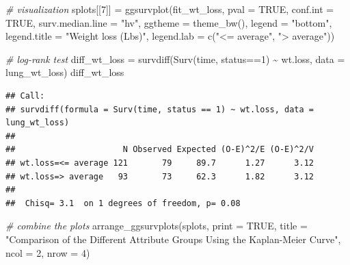 \documentclass[
]{article}
\newenvironment{Shaded}{\begin{snugshade}}{\end{snugshade}}
\newcommand{\AttributeTok}[1]{\textcolor[rgb]{0.77,0.63,0.00}{#1}}
\newcommand{\CommentTok}[1]{\textcolor[rgb]{0.56,0.35,0.01}{\textit{#1}}}
\newcommand{\ConstantTok}[1]{\textcolor[rgb]{0.00,0.00,0.00}{#1}}
\newcommand{\DecValTok}[1]{\textcolor[rgb]{0.00,0.00,0.81}{#1}}
\newcommand{\FunctionTok}[1]{\textcolor[rgb]{0.00,0.00,0.00}{#1}}
\newcommand{\NormalTok}[1]{#1}
\newcommand{\OtherTok}[1]{\textcolor[rgb]{0.56,0.35,0.01}{#1}}
\newcommand{\SpecialCharTok}[1]{\textcolor[rgb]{0.00,0.00,0.00}{#1}}
\newcommand{\StringTok}[1]{\textcolor[rgb]{0.31,0.60,0.02}{#1}}
\begin{document}
\begin{Shaded}
\begin{Highlighting}[]
\CommentTok{\# visualization}
\NormalTok{splots[[}\DecValTok{7}\NormalTok{]] }\OtherTok{=} \FunctionTok{ggsurvplot}\NormalTok{(fit\_wt\_loss, }
                         \AttributeTok{pval =} \ConstantTok{TRUE}\NormalTok{, }\AttributeTok{conf.int =} \ConstantTok{TRUE}\NormalTok{,}
                         \AttributeTok{surv.median.line =} \StringTok{"hv"}\NormalTok{, }
                         \AttributeTok{ggtheme =} \FunctionTok{theme\_bw}\NormalTok{(), }
                         \AttributeTok{legend =} \StringTok{"bottom"}\NormalTok{,}
                         \AttributeTok{legend.title =} \StringTok{"Weight loss (Lbs)"}\NormalTok{,}
                         \AttributeTok{legend.lab =} \FunctionTok{c}\NormalTok{(}\StringTok{"\textless{}= average"}\NormalTok{, }\StringTok{"\textgreater{} average"}\NormalTok{))}

\CommentTok{\# log{-}rank test}
\NormalTok{diff\_wt\_loss }\OtherTok{=} \FunctionTok{survdiff}\NormalTok{(}\FunctionTok{Surv}\NormalTok{(time, status}\SpecialCharTok{==}\DecValTok{1}\NormalTok{) }\SpecialCharTok{\textasciitilde{}}\NormalTok{ wt.loss, }\AttributeTok{data =}\NormalTok{ lung\_wt\_loss) }
\NormalTok{diff\_wt\_loss}
\end{Highlighting}
\end{Shaded}

\begin{verbatim}
## Call:
## survdiff(formula = Surv(time, status == 1) ~ wt.loss, data = lung_wt_loss)
## 
##                      N Observed Expected (O-E)^2/E (O-E)^2/V
## wt.loss=<= average 121       79     89.7      1.27      3.12
## wt.loss=> average   93       73     62.3      1.82      3.12
## 
##  Chisq= 3.1  on 1 degrees of freedom, p= 0.08
\end{verbatim}

\begin{Shaded}
\begin{Highlighting}[]
\CommentTok{\# combine the plots}
\FunctionTok{arrange\_ggsurvplots}\NormalTok{(splots, }
                    \AttributeTok{print =} \ConstantTok{TRUE}\NormalTok{,}
                    \AttributeTok{title =} \StringTok{"Comparison of the Different Attribute Groups Using the Kaplan{-}Meier Curve"}\NormalTok{,}
                    \AttributeTok{ncol =} \DecValTok{2}\NormalTok{, }
                    \AttributeTok{nrow =} \DecValTok{4}\NormalTok{)}
\end{Highlighting}
\end{Shaded}
\end{document}
